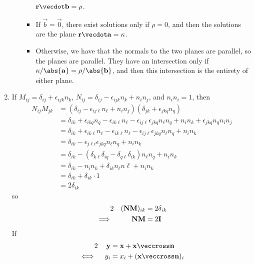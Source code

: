 \documentclass[fleqn,a4paper,11pt]{article}
\begin{document}
\begin{enumerate}[label=\textbf{\arabic*.}]
\begin{enumerate}[label=(\alph*)]
\begin{itemize}
       \(\vec r \vecdot \vec b = \rho\).
      \item
       If \(\vec b = \vec 0\), there exist solutions only if
       \(\rho = 0\), and then the solutions are the plane
       \(\vec r \vecdot \vec a = \kappa\).
      \item
       Otherwise, we have that the normals to the two planes are parallel, so
       the planes are parallel. They have an intersection only if
       \(\kappa / \abs{\vec a} = \rho / \abs{\vec b}\), and then this
       intersection is the entirety of either plane.
     \end{itemize}
   \end{enumerate}
  \item
   If \( M_{ij} = \delta_{ij} + \epsilon_{ijk} n_k\),
   \( N_{ij} = \delta_{ij} - \epsilon_{ijk} n_k + n_i n_j\), and
   \(n_i n_i = 1\), then
   \begin{align*}
     N_{ij}  M_{jk}
     &= (\delta_{ij} - \epsilon_{ij\ell} n_\ell + n_i n_j)
        (\delta_{jk} + \epsilon_{jkq} n_q) \\
     &= \delta_{ik} + \epsilon_{ikq} n_q
        - \epsilon_{ik\ell} n_\ell
        - \epsilon_{ij\ell} \epsilon_{jkq} n_\ell n_q
        + n_i n_k + \epsilon_{jkq} n_q n_i n_j \\
     &= \delta_{ik} + \epsilon_{ik\ell} n_\ell
        - \epsilon_{ik\ell} n_\ell
        - \epsilon_{ij\ell} \epsilon_{jkq} n_\ell n_q
        + n_i n_k \\
     &= \delta_{ik}
        - \epsilon_{j\ell i} \epsilon_{jkq} n_\ell n_q
        + n_i n_k \\
     &= \delta_{ik}
        - (\delta_{k\ell}\delta_{iq} - \delta_{q\ell}\delta_{ik}) n_\ell n_q
        + n_i n_k \\
     &= \delta_{ik}
        - n_i n_k + \delta_{ik} n_\ell n\ell
        + n_i n_k \\
     &= \delta_{ik}
        + \delta_{ik} \cdot 1 \\
     &= 2\delta_{ik}
   \end{align*}
   so
   \begin{alignat*}2
    && (\mat N \mat M)_{ik} &= 2\delta_{ik} \\
    \implies{}&& \mat N \mat M &= 2\mat I
   \end{alignat*}
   If
   \begin{alignat*}2
    && \vec y &= \vec x + \vec x \veccross \vec n \\
    \iff{}&& y_i &= x_i + (\vec x \veccross \vec n)_i \\

\end{alignat*}
\end{enumerate}
\end{document}
